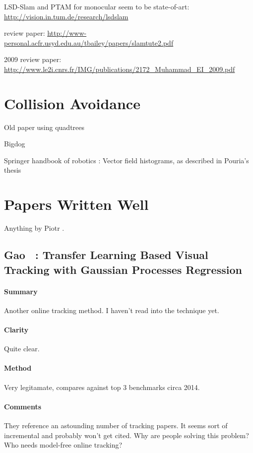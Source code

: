 LSD-Slam and PTAM for monocular seem to be state-of-art: \url{http://vision.in.tum.de/research/lsdslam}

review paper: \url{http://www-personal.acfr.usyd.edu.au/tbailey/papers/slamtute2.pdf}

2009 review paper: \url{http://www.le2i.cnrs.fr/IMG/publications/2172_Muhammad_EI_2009.pdf}

\section{Collision Avoidance}
Old paper using quadtrees\cite{ghoshray1996comprehensive}

Bigdog \cite{raibert2008bigdog}

Springer handbook of robotics \cite{siciliano2008springer}: Vector field histograms, as described in Pouria's thesis \cite{talebifard2014risk}


\section{Papers Written Well}
Anything by Piotr \cite{dollar2014fast}.

\subsection{Gao \etal~\cite{gao2014transfer}: Transfer Learning Based Visual Tracking
with Gaussian Processes Regression}
\paragraph{Summary} Another online tracking method. I haven't read into the technique yet.
\paragraph{Clarity} Quite clear. 
\paragraph{Method} Very legitamate, compares against top 3 benchmarks circa 2014.
\paragraph{Comments} They reference an astounding number of tracking papers. It seems sort of incremental and probably won't get cited. Why are people solving this problem? Who needs model-free online tracking?
